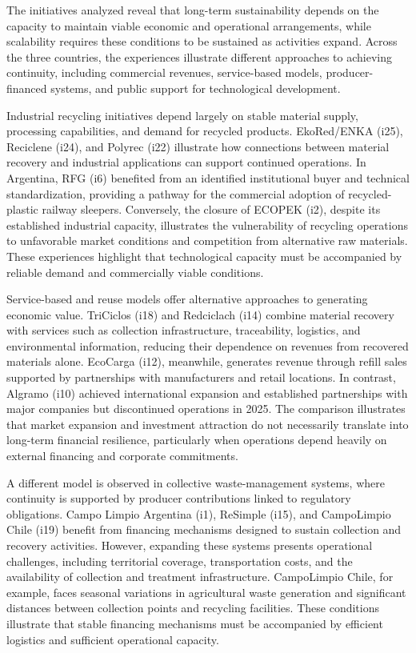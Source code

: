 \documentclass[
  12pt,
  oneside]{book}
\begin{document}
The initiatives analyzed reveal that long-term sustainability depends on
the capacity to maintain viable economic and operational arrangements,
while scalability requires these conditions to be sustained as
activities expand. Across the three countries, the experiences
illustrate different approaches to achieving continuity, including
commercial revenues, service-based models, producer-financed systems,
and public support for technological development.

Industrial recycling initiatives depend largely on stable material
supply, processing capabilities, and demand for recycled products.
EkoRed/ENKA (i25), Reciclene (i24), and Polyrec (i22) illustrate how
connections between material recovery and industrial applications can
support continued operations. In Argentina, RFG (i6) benefited from an
identified institutional buyer and technical standardization, providing
a pathway for the commercial adoption of recycled-plastic railway
sleepers. Conversely, the closure of ECOPEK (i2), despite its
established industrial capacity, illustrates the vulnerability of
recycling operations to unfavorable market conditions and competition
from alternative raw materials. These experiences highlight that
technological capacity must be accompanied by reliable demand and
commercially viable conditions.

Service-based and reuse models offer alternative approaches to
generating economic value. TriCiclos (i18) and Redciclach (i14) combine
material recovery with services such as collection infrastructure,
traceability, logistics, and environmental information, reducing their
dependence on revenues from recovered materials alone. EcoCarga (i12),
meanwhile, generates revenue through refill sales supported by
partnerships with manufacturers and retail locations. In contrast,
Algramo (i10) achieved international expansion and established
partnerships with major companies but discontinued operations in 2025.
The comparison illustrates that market expansion and investment
attraction do not necessarily translate into long-term financial
resilience, particularly when operations depend heavily on external
financing and corporate commitments.

A different model is observed in collective waste-management systems,
where continuity is supported by producer contributions linked to
regulatory obligations. Campo Limpio Argentina (i1), ReSimple (i15), and
CampoLimpio Chile (i19) benefit from financing mechanisms designed to
sustain collection and recovery activities. However, expanding these
systems presents operational challenges, including territorial coverage,
transportation costs, and the availability of collection and treatment
infrastructure. CampoLimpio Chile, for example, faces seasonal
variations in agricultural waste generation and significant distances
between collection points and recycling facilities. These conditions
illustrate that stable financing mechanisms must be accompanied by
efficient logistics and sufficient operational capacity.
\end{document}
